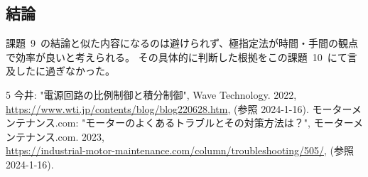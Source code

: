 \documentclass[10pt]{jarticle}
\begin{document}
%

\subsection{結論}
%
課題\ 9\ の結論と似た内容になるのは避けられず、極指定法が時間・手間の観点で効率が良いと考えられる。
その具体的に判断した根拠をこの課題\ 10\ にて言及したに過ぎなかった。

%

\begin{thebibliography}{5}
    今井: "電源回路の比例制御と積分制御", Wave Technology. 2022, \\
    \url{https://www.wti.jp/contents/blog/blog220628.htm}, (参照 2024-1-16).
	  モーターメンテナンス.com: "モーターのよくあるトラブルとその対策方法は？", モーターメンテナンス.com. 2023, \\
		\url{https://industrial-motor-maintenance.com/column/troubleshooting/505/}, (参照 2024-1-16).
\end{thebibliography}
\end{document}
